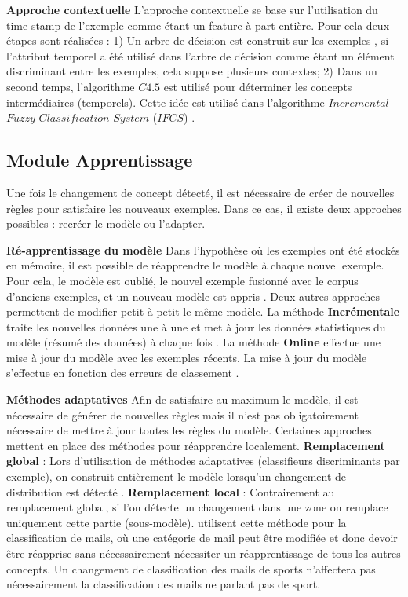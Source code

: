 \documentclass[utf8]{stageM2R} %
\theoremstyle{remark}
\renewcommand{\emph}{\textbf}
\begin{document}
 \textbf{Approche contextuelle}
L'approche contextuelle se base sur l'utilisation du time-stamp de l'exemple comme étant un feature à part entière. Pour cela deux étapes sont réalisées : 1) Un arbre de décision est construit sur les exemples , si l'attribut temporel a été utilisé dans l'arbre de décision comme étant un élément discriminant entre les exemples, cela suppose plusieurs contextes; 2) Dans un second temps, l'algorithme $C4.5$ \cite{Quinlan2014} est utilisé pour déterminer les concepts intermédiaires (temporels). Cette idée est utilisé dans l'algorithme $Incremental$ $Fuzzy$ $Classification$ $System$ ($IFCS$) \cite{Bouchachia2011}.

\subsection{Module Apprentissage}

Une fois le changement de concept détecté, il est nécessaire de créer de nouvelles règles pour satisfaire les nouveaux exemples. Dans ce cas, il existe deux approches possibles : recréer le modèle ou l'adapter.
 
\textbf{Ré-apprentissage du modèle}
Dans l'hypothèse où les exemples ont été stockés en mémoire, il est possible de réapprendre le modèle à chaque nouvel exemple. Pour cela, le modèle est oublié, le nouvel exemple fusionné avec le corpus d'anciens exemples, et un nouveau modèle est appris \cite{klinkenberg2000detecting}.
Deux autres approches permettent de modifier petit à petit le même modèle.
La méthode  \emph{Incrémentale} traite les nouvelles données une à une et met à jour les données statistiques du modèle (résumé des données) à chaque fois \cite{Hulten2001}.
La méthode  \emph{Online} effectue une mise à jour du modèle avec les exemples récents. La mise à jour du modèle s'effectue en fonction des erreurs de classement \cite{Littlestone1988}.

\textbf{Méthodes adaptatives} Afin de satisfaire au maximum le modèle, il est nécessaire de générer de nouvelles règles mais il n'est pas obligatoirement nécessaire de mettre à jour toutes les règles du modèle. Certaines approches mettent en place des méthodes pour réapprendre localement.
\emph{Remplacement global} : Lors d'utilisation de méthodes adaptatives (classifieurs discriminants par exemple), on construit entièrement le modèle lorsqu'un changement de distribution est détecté \cite{Gama2004}.
\emph{Remplacement local} : Contrairement au remplacement global, si l'on détecte un changement dans une zone on remplace uniquement cette partie (sous-modèle). \cite{Carmona-Cejudo2011} utilisent cette méthode pour la classification de mails, où une catégorie de mail peut être modifiée et donc devoir être réapprise sans nécessairement nécessiter un réapprentissage de tous les autres concepts. Un changement de classification des mails de sports n'affectera pas nécessairement la classification des mails ne parlant pas de sport.
\end{document}
